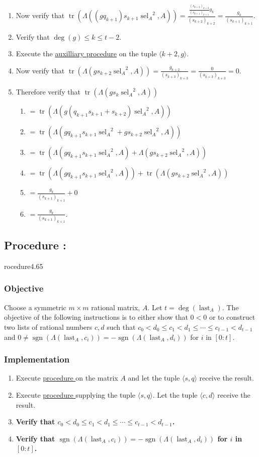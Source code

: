 \documentclass{article}
\DeclareMathOperator{\sgn}{sgn}
\DeclareMathOperator{\tr}{tr}
\DeclareMathOperator{\sel}{sel}
\DeclareMathOperator{\last}{last}
\newcounter{procedure}[part]
\newcommand{\procedure}[1]{\subsection*{Procedure \thepart:\theprocedure}\label{sec:procedure #1}\global\expandafter\edef\csname procedure#1\endcsname{\thepart:\theprocedure}\addtocounter{procedure}{1}}
\newcommand{\objective}{\subsubsection*{Objective}}
\newcommand{\implementation}{\subsubsection*{Implementation}}
\newcommand{\procedurehr}[1]{\hyperref[sec:procedure #1]{procedure \expandafter\csname procedure#1\endcsname}}
\begin{document}
\begin{multicols}{2}
\begin{enumerate}
\begin{enumerate}
							\item Now verify that $\tr(\Lambda((gq_{k+1})s_{k+1}{\sel_A}^2,A))=\frac{\frac{(s_{k+2})_{k+2}}{(s_{k+1})_{k+1}}g_k}{(s_{k+2})_{k+2}}=\frac{g_k}{(s_{k+1})_{k+1}}$.
							\item Verify that $\deg(g)\le k\le t-2$.
							\item Execute the \hyperref[sec:procedure 73 auxilliary procedure]{auxilliary procedure} on the tuple $\langle k+2,g\rangle$.
							\item Now verify that $\tr(\Lambda(gs_{k+2}{\sel_A}^2,A))=\frac{g_{k+2}}{(s_{k+3})_{k+3}}=\frac{0}{(s_{k+3})_{k+3}}=0$.
							\item Therefore verify that $\tr(\Lambda(gs_k{\sel_A}^2,A))$
							\begin{enumerate}
								\item $=\tr(\Lambda(g(q_{k+1}s_{k+1}+s_{k+2}){\sel_A}^2,A))$
								\item $=\tr(\Lambda(gq_{k+1}s_{k+1}{\sel_A}^2+gs_{k+2}{\sel_A}^2,A))$
								\item $=\tr(\Lambda(gq_{k+1}s_{k+1}{\sel_A}^2,A)+\Lambda(gs_{k+2}{\sel_A}^2,A))$
								\item $=\tr(\Lambda(gq_{k+1}s_{k+1}{\sel_A}^2,A))+\tr(\Lambda(gs_{k+2}{\sel_A}^2,A))$
								\item $=\frac{g_k}{(s_{k+1})_{k+1}}+0$
								\item $=\frac{g_k}{(s_{k+1})_{k+1}}$.
							\end{enumerate}
						\end{enumerate}
					\end{enumerate}
		\procedure{4.65}
			\objective
				Choose a symmetric $m\times m$ rational matrix, $A$. Let $t=\deg(\last_A)$. The objective of the following instructions is to either show that $0<0$ or to construct two lists of rational numbers $c,d$ such that $c_0<d_0\le c_1<d_1\le\cdots\le c_{t-1}<d_{t-1}$ and $0\ne\sgn(\Lambda(\last_A,c_i))=-\sgn(\Lambda(\last_A,d_i))$ for $i$ in $[0:t]$.
			\implementation
				\begin{enumerate}
					\item Execute \procedurehr{4.64} on the matrix $A$ and let the tuple $\langle s,q\rangle$ receive the result.
					\item Execute \procedurehr{2.24} supplying the tuple $\langle s,q\rangle$. Let the tuple $\langle c,d\rangle$ receive the result.
					\item \textbf{Verify that $c_0<d_0\le c_1<d_1\le\cdots\le c_{t-1}<d_{t-1}$.}
					\item \textbf{Verify that $\sgn(\Lambda(\last_A,c_i))=-\sgn(\Lambda(\last_A,d_i))$ for $i$ in $[0:t]$.}

\end{enumerate}
\end{multicols}
\end{document}
